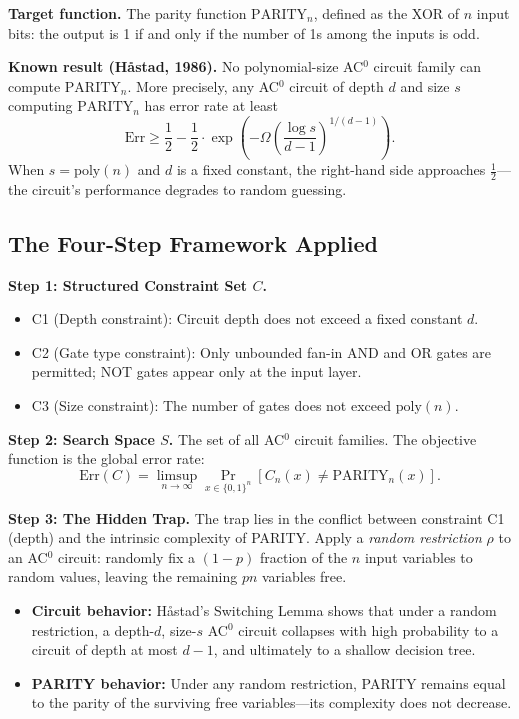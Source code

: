 \documentclass[11pt,a4paper]{article}
\theoremstyle{plain}
\theoremstyle{definition}
\theoremstyle{remark}
\newcommand{\Err}{\mathrm{Err}}
\begin{document}
\textbf{Target function.} The parity function $\mathrm{PARITY}_n$, defined as the XOR of $n$ input bits: the output is 1 if and only if the number of 1s among the inputs is odd.

\textbf{Known result (H\r{a}stad, 1986).} No polynomial-size AC$^0$ circuit family can compute $\mathrm{PARITY}_n$. More precisely, any AC$^0$ circuit of depth $d$ and size $s$ computing $\mathrm{PARITY}_n$ has error rate at least
$$\Err \geq \frac{1}{2} - \frac{1}{2} \cdot \exp\!\left(-\Omega\!\left(\frac{\log s}{d-1}\right)^{1/(d-1)}\right).$$
When $s = \mathrm{poly}(n)$ and $d$ is a fixed constant, the right-hand side approaches $\frac{1}{2}$---the circuit's performance degrades to random guessing.

\subsection{The Four-Step Framework Applied}

\textbf{Step 1: Structured Constraint Set $C$.}
\begin{itemize}
\item C1 (Depth constraint): Circuit depth does not exceed a fixed constant $d$.
\item C2 (Gate type constraint): Only unbounded fan-in AND and OR gates are permitted; NOT gates appear only at the input layer.
\item C3 (Size constraint): The number of gates does not exceed $\mathrm{poly}(n)$.
\end{itemize}

\textbf{Step 2: Search Space $S$.} The set of all AC$^0$ circuit families. The objective function is the global error rate:
$$\Err(C) = \limsup_{n \to \infty} \Pr_{x \in \{0,1\}^n}\!\left[C_n(x) \neq \mathrm{PARITY}_n(x)\right].$$

\textbf{Step 3: The Hidden Trap.} The trap lies in the conflict between constraint C1 (depth) and the intrinsic complexity of PARITY. Apply a \emph{random restriction} $\rho$ to an AC$^0$ circuit: randomly fix a $(1-p)$ fraction of the $n$ input variables to random values, leaving the remaining $pn$ variables free.

\begin{itemize}
\item \textbf{Circuit behavior:} H\r{a}stad's Switching Lemma shows that under a random restriction, a depth-$d$, size-$s$ AC$^0$ circuit collapses with high probability to a circuit of depth at most $d-1$, and ultimately to a shallow decision tree.
\item \textbf{PARITY behavior:} Under any random restriction, PARITY remains equal to the parity of the surviving free variables---its complexity does not decrease.
\end{itemize}
\end{document}
